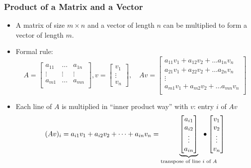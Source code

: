\documentclass[8pt,dvipsnames]{beamer}
\begin{document}
\begin{frame}
  \frametitle{Product of a Matrix and a Vector}
  \begin{itemize}
  \item A matrix of size $m\times n$ and a vector of length $n$ can be multiplied to form a vector of length $m$.
  \item Formal rule:
    $$
    A =
    \begin{bmatrix}
      a_{11}&\dots& a_{1n}\\
      \vdots & \vdots & \vdots\\
      a_{m1}&\dots& a_{mn}\\
    \end{bmatrix},
    v =
    \begin{bmatrix}
      v_1\\\vdots\\ v_n
    \end{bmatrix},\quad
    A v =
    \begin{bmatrix}
      a_{11} v_1 + a_{12}v_2 + \dots a_{1n} v_n\\
      a_{21} v_1 + a_{22}v_2 + \dots a_{2n} v_n\\
      \vdots\\
      a_{m1} v_1 + a_{m2}v_2 + \dots a_{mn} v_n\\
    \end{bmatrix}
    $$
  \item Each line of $A$ is multiplied in ``inner product way'' with $v$: entry $i$ of $Av$
    $$
    (Av)_i = a_{i1}v_1+a_{i2}v_2+\dots+a_{in}v_n =
    \udesc{\text{transpose of line } i\text{ of }A}{\begin{bmatrix}
      a_{i1}\\a_{i2}\\\vdots\\a_{in}
    \end{bmatrix}}\!\!\!\!\!\!\!\!\!\!\!\!\!\bullet
    \begin{bmatrix}
      v_1\\v_2\\\vdots\\ v_n
    \end{bmatrix}
    $$
  
  \end{itemize}
\end{frame}
\end{document}
